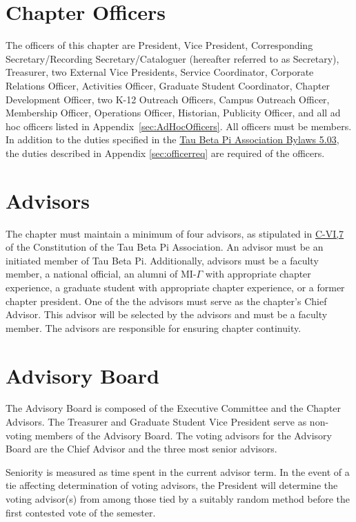 \section{Chapter Officers} The officers of this chapter are  President, Vice President, Corresponding Secretary/Recording Secretary/Cataloguer 
(hereafter referred to as Secretary), Treasurer, two External Vice Presidents,
 Service Coordinator, Corporate Relations Officer, Activities Officer,  Graduate Student Coordinator, Chapter Development Officer, two K-12 Outreach
 Officers, Campus Outreach Officer, Membership Officer, Operations  Officer,  %
Historian, Publicity Officer, and all ad hoc officers listed in Appendix~\ref{sec:AdHocOfficers}.  All officers must be  members. In addition to the duties specified in the \href{http://www.tbp.org/off/ConstBylaw.pdf}{Tau Beta Pi Association Bylaws 5.03}, the duties described in Appendix \ref{sec:officerreq} are required of the officers.

\section{Advisors}\label{sec:advisors} The chapter must maintain a minimum of four advisors, as stipulated in \href{http://www.tbp.org/off/ConstBylaw.pdf}{C-VI,7} of the Constitution of the Tau Beta Pi Association. An advisor must be an initiated member of Tau Beta Pi. Additionally, advisors must be a faculty member, %
a national official, %
an alumni of MI-$\Gamma$ with appropriate chapter experience, a graduate student with appropriate chapter experience, or a former chapter president. One of the the advisors must serve as the chapter's Chief Advisor. This advisor will be selected by the advisors and must be a faculty member. The advisors are responsible for ensuring chapter continuity.

\section{Advisory Board}\label{sec:advbrd} The Advisory Board is composed of the Executive Committee and the Chapter Advisors.  The Treasurer and Graduate Student Vice President serve as  non-voting members of the Advisory Board. The voting advisors for the Advisory Board are the Chief Advisor and the three most senior advisors.
\begin{enumsubsection}
\itemnotoc Seniority is measured as time spent in the current advisor term.
\itemnotoc In the event of a tie affecting determination of voting advisors, the President will determine the voting advisor(s) from among those tied by a suitably random method before the first contested vote of the semester.
\end{enumsubsection}

